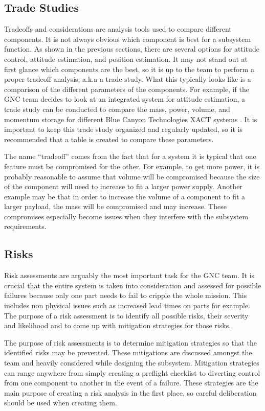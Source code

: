 \documentclass{article}
\begin{document}
\subsection{Trade Studies}

Tradeoffs and considerations are analysis tools used to compare
different components. It is not always obvious which component is best
for a subsystem function. As shown in the previous sections, there are several
options for attitude control, attitude estimation, and position
estimation. It may not stand out at first glance which components are
the best, so it is up to the team to perform a proper tradeoff
analysis, a.k.a a trade study. What this typically looks like is a
comparison of the different parameters of the components. For example,
if the GNC team decides to look at an integrated system for attitude
estimation, a trade study can be conducted to compare the mass, power,
volume, and momentum storage for different Blue Canyon Technologies
XACT systems \cite{qp20}. It is important to keep this trade study organized
and regularly updated, so it is recommended that a table is created to
compare these parameters.  

The name “tradeoff” comes from the fact that for a system it is
typical that one feature must be compromised for the other. For
example, to get more power, it is probably reasonable to assume that
volume will be compromised because the size of the component will need
to increase to fit a larger power supply. Another example may be that
in order to increase the volume of a component to fit a larger
payload, the mass will be compromised and may increase. These
compromises especially become issues when they interfere with the
subsystem requirements.

\subsection{Risks}

Risk assessments are arguably the most important task for the GNC
team. It is crucial that the entire system is taken into consideration
and assessed for possible failures because only one part needs to fail
to cripple the whole mission. This includes non physical issues such
as increased lead times on parts for example. The purpose of a risk
assessment is to identify all possible risks, their severity and
likelihood and to come up with mitigation strategies for those risks. 

The purpose of risk assessments is to determine mitigation strategies
so that the identified risks may be prevented. These mitigations are
discussed amongst the team and heavily considered while designing the
subsystem. Mitigation strategies can range anywhere from simply
creating a preflight checklist to diverting control from one component
to another in the event of a failure. These strategies are the main
purpose of creating a risk analysis in the first place, so careful
deliberation should be used when creating them. 
\end{document}
